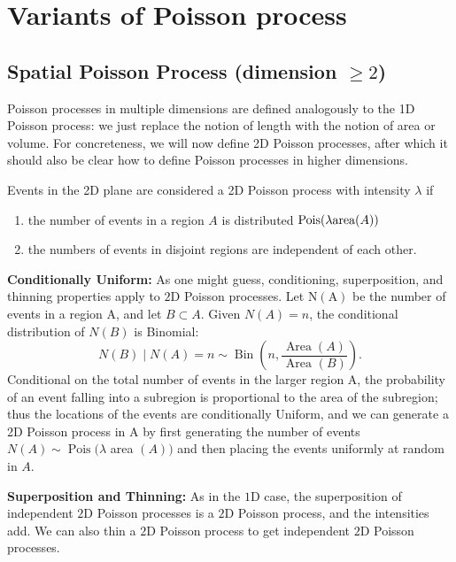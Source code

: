 \documentclass[11pt]{elegantbook}
\begin{document}
\section{Variants of Poisson process}
\subsection{Spatial Poisson Process (dimension $\geq 2$)}
Poisson processes in multiple dimensions are defined analogously to the 1D Poisson process: we just replace the notion of length with the notion of area or volume. For concreteness, we will now define 2D Poisson processes, after which it should also be clear how to define Poisson processes in higher dimensions.
\begin{definition}
    Events in the 2D plane are considered a 2D Poisson process with intensity $\lambda$ if
    \begin{enumerate}
        \item the number of events in a region $A$ is distributed $\textnormal{Pois}(\lambda\textnormal{area}(A))$
        \item the numbers of events in disjoint regions are independent of each other.
    \end{enumerate}
\end{definition}
\textbf{Conditionally Uniform:}
As one might guess, conditioning, superposition, and thinning properties apply to $2 \mathrm{D}$ Poisson processes. Let $\mathrm{N}(\mathrm{A})$ be the number of events in a region $\mathrm{A}$, and let $B \subset A$. Given $N(A)=n$, the conditional distribution of $N(B)$ is Binomial:
$$
N(B) \mid N(A)=n \sim \operatorname{Bin}\left(n, \frac{\operatorname{Area}(A)}{\text { Area }(B)}\right) .
$$
Conditional on the total number of events in the larger region $\mathrm{A}$, the probability of an event falling into a subregion is proportional to the area of the subregion; thus the locations of the events are conditionally Uniform, and we can generate a 2D Poisson process in A by first generating the number of events $N(A) \sim \operatorname{Pois}(\lambda$ area $(A))$ and then placing the events uniformly at random in $A$.

\textbf{Superposition and Thinning:} As in the $1 \mathrm{D}$ case, the superposition of independent $2 \mathrm{D}$ Poisson processes is a $2 \mathrm{D}$ Poisson process, and the intensities add. We can also thin a $2 \mathrm{D}$ Poisson process to get independent $2 \mathrm{D}$ Poisson processes.
\end{document}
